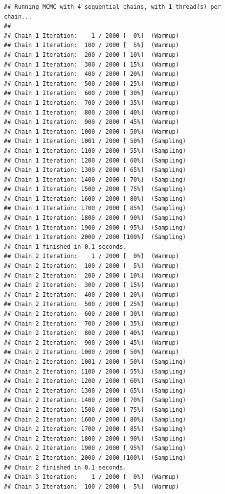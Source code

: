 \documentclass[
]{book}
\begin{document}
\begin{verbatim}
## Running MCMC with 4 sequential chains, with 1 thread(s) per chain...
## 
## Chain 1 Iteration:    1 / 2000 [  0%]  (Warmup) 
## Chain 1 Iteration:  100 / 2000 [  5%]  (Warmup) 
## Chain 1 Iteration:  200 / 2000 [ 10%]  (Warmup) 
## Chain 1 Iteration:  300 / 2000 [ 15%]  (Warmup) 
## Chain 1 Iteration:  400 / 2000 [ 20%]  (Warmup) 
## Chain 1 Iteration:  500 / 2000 [ 25%]  (Warmup) 
## Chain 1 Iteration:  600 / 2000 [ 30%]  (Warmup) 
## Chain 1 Iteration:  700 / 2000 [ 35%]  (Warmup) 
## Chain 1 Iteration:  800 / 2000 [ 40%]  (Warmup) 
## Chain 1 Iteration:  900 / 2000 [ 45%]  (Warmup) 
## Chain 1 Iteration: 1000 / 2000 [ 50%]  (Warmup) 
## Chain 1 Iteration: 1001 / 2000 [ 50%]  (Sampling) 
## Chain 1 Iteration: 1100 / 2000 [ 55%]  (Sampling) 
## Chain 1 Iteration: 1200 / 2000 [ 60%]  (Sampling) 
## Chain 1 Iteration: 1300 / 2000 [ 65%]  (Sampling) 
## Chain 1 Iteration: 1400 / 2000 [ 70%]  (Sampling) 
## Chain 1 Iteration: 1500 / 2000 [ 75%]  (Sampling) 
## Chain 1 Iteration: 1600 / 2000 [ 80%]  (Sampling) 
## Chain 1 Iteration: 1700 / 2000 [ 85%]  (Sampling) 
## Chain 1 Iteration: 1800 / 2000 [ 90%]  (Sampling) 
## Chain 1 Iteration: 1900 / 2000 [ 95%]  (Sampling) 
## Chain 1 Iteration: 2000 / 2000 [100%]  (Sampling) 
## Chain 1 finished in 0.1 seconds.
## Chain 2 Iteration:    1 / 2000 [  0%]  (Warmup) 
## Chain 2 Iteration:  100 / 2000 [  5%]  (Warmup) 
## Chain 2 Iteration:  200 / 2000 [ 10%]  (Warmup) 
## Chain 2 Iteration:  300 / 2000 [ 15%]  (Warmup) 
## Chain 2 Iteration:  400 / 2000 [ 20%]  (Warmup) 
## Chain 2 Iteration:  500 / 2000 [ 25%]  (Warmup) 
## Chain 2 Iteration:  600 / 2000 [ 30%]  (Warmup) 
## Chain 2 Iteration:  700 / 2000 [ 35%]  (Warmup) 
## Chain 2 Iteration:  800 / 2000 [ 40%]  (Warmup) 
## Chain 2 Iteration:  900 / 2000 [ 45%]  (Warmup) 
## Chain 2 Iteration: 1000 / 2000 [ 50%]  (Warmup) 
## Chain 2 Iteration: 1001 / 2000 [ 50%]  (Sampling) 
## Chain 2 Iteration: 1100 / 2000 [ 55%]  (Sampling) 
## Chain 2 Iteration: 1200 / 2000 [ 60%]  (Sampling) 
## Chain 2 Iteration: 1300 / 2000 [ 65%]  (Sampling) 
## Chain 2 Iteration: 1400 / 2000 [ 70%]  (Sampling) 
## Chain 2 Iteration: 1500 / 2000 [ 75%]  (Sampling) 
## Chain 2 Iteration: 1600 / 2000 [ 80%]  (Sampling) 
## Chain 2 Iteration: 1700 / 2000 [ 85%]  (Sampling) 
## Chain 2 Iteration: 1800 / 2000 [ 90%]  (Sampling) 
## Chain 2 Iteration: 1900 / 2000 [ 95%]  (Sampling) 
## Chain 2 Iteration: 2000 / 2000 [100%]  (Sampling) 
## Chain 2 finished in 0.1 seconds.
## Chain 3 Iteration:    1 / 2000 [  0%]  (Warmup) 
## Chain 3 Iteration:  100 / 2000 [  5%]  (Warmup) 

\end{verbatim}
\end{document}
